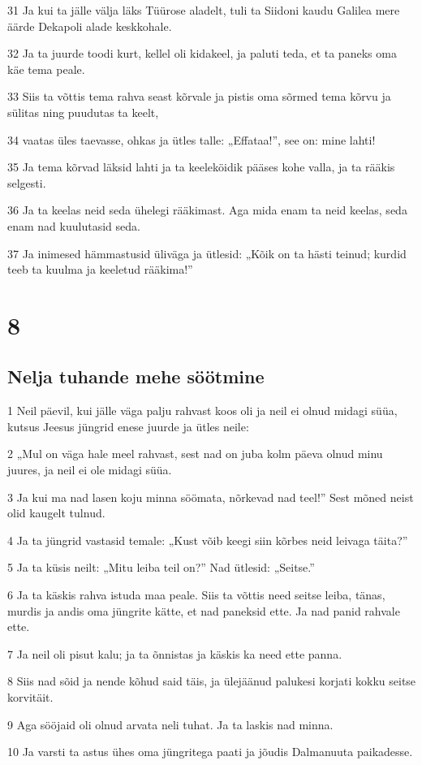\par 31 Ja kui ta jälle välja läks Tüürose aladelt, tuli ta Siidoni kaudu Galilea mere äärde Dekapoli alade keskkohale.
\par 32 Ja ta juurde toodi kurt, kellel oli kidakeel, ja paluti teda, et ta paneks oma käe tema peale.
\par 33 Siis ta võttis tema rahva seast kõrvale ja pistis oma sõrmed tema kõrvu ja sülitas ning puudutas ta keelt,
\par 34 vaatas üles taevasse, ohkas ja ütles talle: „Effataa!”, see on: mine lahti!
\par 35 Ja tema kõrvad läksid lahti ja ta keeleköidik pääses kohe valla, ja ta rääkis selgesti.
\par 36 Ja ta keelas neid seda ühelegi rääkimast. Aga mida enam ta neid keelas, seda enam nad kuulutasid seda.
\par 37 Ja inimesed hämmastusid üliväga ja ütlesid: „Kõik on ta hästi teinud; kurdid teeb ta kuulma ja keeletud rääkima!”


\chapter{8}

\section*{Nelja tuhande mehe söötmine}

\par 1 Neil päevil, kui jälle väga palju rahvast koos oli ja neil ei olnud midagi süüa, kutsus Jeesus jüngrid enese juurde ja ütles neile:
\par 2 „Mul on väga hale meel rahvast, sest nad on juba kolm päeva olnud minu juures, ja neil ei ole midagi süüa.
\par 3 Ja kui ma nad lasen koju minna söömata, nõrkevad nad teel!” Sest mõned neist olid kaugelt tulnud.
\par 4 Ja ta jüngrid vastasid temale: „Kust võib keegi siin kõrbes neid leivaga täita?”
\par 5 Ja ta küsis neilt: „Mitu leiba teil on?” Nad ütlesid: „Seitse.”
\par 6 Ja ta käskis rahva istuda maa peale. Siis ta võttis need seitse leiba, tänas, murdis ja andis oma jüngrite kätte, et nad paneksid ette. Ja nad panid rahvale ette.
\par 7 Ja neil oli pisut kalu; ja ta õnnistas ja käskis ka need ette panna.
\par 8 Siis nad sõid ja nende kõhud said täis, ja ülejäänud palukesi korjati kokku seitse korvitäit.
\par 9 Aga sööjaid oli olnud arvata neli tuhat. Ja ta laskis nad minna.
\par 10 Ja varsti ta astus ühes oma jüngritega paati ja jõudis Dalmanuuta paikadesse.

